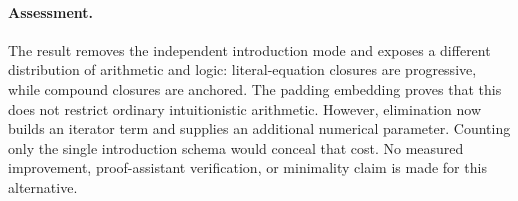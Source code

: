 \paragraph{Assessment.}
The result removes the independent introduction mode and exposes a
different distribution of arithmetic and logic: literal-equation
closures are progressive, while compound closures are anchored.
The padding embedding proves that this does not restrict ordinary
intuitionistic arithmetic.  However, elimination now builds an iterator
term and supplies an additional numerical parameter.  Counting only the
single introduction schema would conceal that cost.  No measured
improvement, proof-assistant verification, or minimality claim is made
for this alternative.
